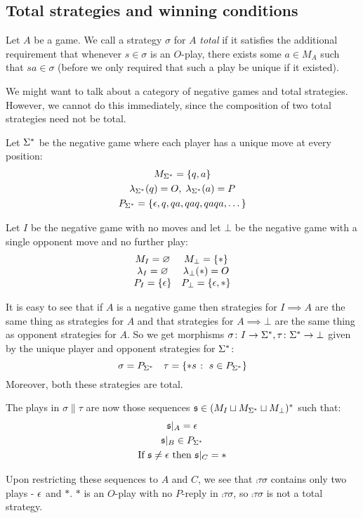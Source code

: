 \documentclass[11pt]{article} %
\begin{document}
\subsection{Total strategies and winning conditions}

Let $A$ be a game.  We call a strategy $\sigma$ for $A$ \emph{total} if it satisfies the additional requirement that whenever $s\in\sigma$ is an $O$-play, there exists some $a\in M_A$ such that $sa\in\sigma$ (before we only required that such a play be unique if it existed).  

We might want to talk about a category of negative games and total strategies.  However, we cannot do this immediately, since the composition of two total strategies need not be total.  

\begin{example}
  \label{TotalCompositionExample}
  Let ${\Sigma^*}$ be the negative game where each player has a unique move at every position:
  \begin{gather*}
    M_{{\Sigma^*}} = \{q,a\} \\
    \lambda_{{\Sigma^*}}(q) = O,\;\lambda_{{\Sigma^*}}(a)=P \\
    P_{{\Sigma^*}} = \{\epsilon, q, qa, qaq, qaqa, \dots\}
  \end{gather*}

  Let $I$ be the negative game with no moves and let $\bot$ be the negative game with a single opponent move and no further play:
  \[
    \begin{matrix}
      M_I=\varnothing & M_\bot = \{*\} \\
      \lambda_I=\varnothing  & \lambda_\bot(*)=O \\
      P_I=\{\epsilon\} & P_\bot = \{\epsilon, *\}
    \end{matrix}
    \]

  It is easy to see that if $A$ is a negative game then strategies for $I\implies A$ are the same thing as strategies for $A$ and that strategies for $A\implies\bot$ are the same thing as opponent strategies for $A$.  So we get morphisms $\sigma\colon{}I\to{}{\Sigma^*},\tau\colon{}{\Sigma^*}\to{}\bot$ given by the unique player and opponent strategies for ${\Sigma^*}$:
  \[
    \sigma = P_{\Sigma^*}\quad\tau = \{*s\;\colon\; s\in P_{\Sigma^*}\}
    \]
  Moreover, both these strategies are total.

  The plays in $\sigma\|\tau$ are now those sequences $\mathfrak s\in(M_I\sqcup M_{\Sigma^*}\sqcup M_\bot)^*$ such that:
  \begin{gather*}
    \mathfrak s\vert_A=\epsilon \\
    \mathfrak s\vert_B\in P_{\Sigma^*} \\
    \textrm{If $\mathfrak s\ne\epsilon$ then $\mathfrak s\vert_C=*$}
  \end{gather*}

  Upon restricting these sequences to $A$ and $C$, we see that $\comp\tau\sigma$ contains only two plays - $\epsilon$ and $*$.  $*$ is an $O$-play with no $P$-reply in $\comp\tau\sigma$, so $\comp\tau\sigma$ is not a total strategy.
\end{example}
\end{document}
